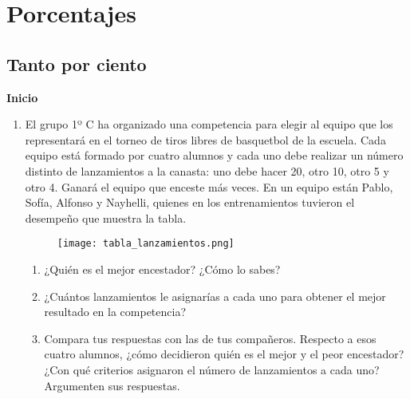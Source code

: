 \thispagestyle{plain}
\section{Porcentajes}


\subsection{Tanto por ciento}

\begin{boxK}
    \begin{center}\textbf{Inicio}\end{center}
    \begin{enumerate}
        \item El grupo 1º C ha organizado una competencia para elegir al equipo que los
              representará en el torneo de tiros libres de basquetbol de la escuela. Cada
              equipo está formado por cuatro alumnos y cada uno debe realizar un número distinto
              de lanzamientos a la canasta: uno debe hacer 20, otro 10, otro 5 y
              otro 4. Ganará el equipo que enceste más veces.
              En un equipo están Pablo, Sofía, Alfonso y Nayhelli, quienes en los entrenamientos
              tuvieron el desempeño que muestra la tabla.
              \begin{figure}[H]
                  \centering
                  \texttt{[image: tabla\_lanzamientos.png]}
                  \label{fig:tabla_lanzamientos}
              \end{figure}
              \begin{enumerate}
                  \item ¿Quién es el mejor encestador? ¿Cómo lo sabes?
                  \item ¿Cuántos lanzamientos le asignarías a cada uno para obtener el mejor resultado en la competencia?
                  \item Compara tus respuestas con las de tus compañeros. Respecto a
                        esos cuatro alumnos, ¿cómo decidieron quién es el mejor y el
                        peor encestador? ¿Con qué criterios asignaron el número de
                        lanzamientos a cada uno? Argumenten sus respuestas.
              \end{enumerate}

    \end{enumerate}
\end{boxK}

